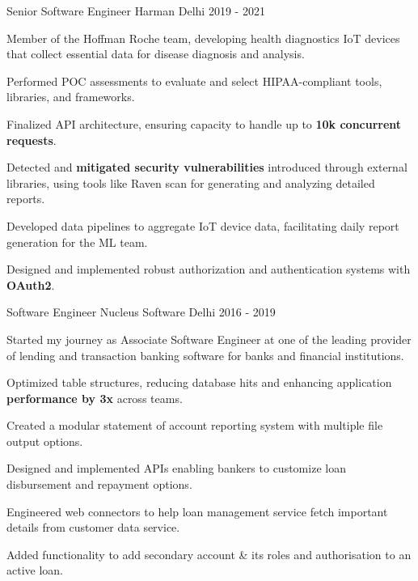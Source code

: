 \begin{cventries}
  \cventry
    {Senior Software Engineer} %
    {Harman} %
    {Delhi} %
    {2019 - 2021} %
    {
      \begin{cvitems} %
        \item {Member of the Hoffman Roche team, developing health diagnostics IoT devices that collect essential data for disease diagnosis and analysis.}
        \item {Performed POC assessments to evaluate and select HIPAA-compliant tools, libraries, and frameworks.}
        \item {Finalized API architecture, ensuring capacity to handle up to \textbf{10k concurrent requests}.}
        \item {Detected and \textbf{mitigated security vulnerabilities} introduced through external libraries, using tools like Raven scan for generating and analyzing detailed reports.}
        \item {Developed data pipelines to aggregate IoT device data, facilitating daily report generation for the ML team.}
        \item {Designed and implemented robust authorization and authentication systems with \textbf{OAuth2}.}
      \end{cvitems}
    }

  \cventry
    {Software Engineer} %
    {Nucleus Software} %
    {Delhi} %
    {2016 - 2019} %
    {
      \begin{cvitems} %
        \item {Started my journey as Associate Software Engineer at one of the leading provider of lending and transaction banking software for banks and financial institutions.}
        \item {Optimized table structures, reducing database hits and enhancing application \textbf{performance by 3x} across teams.}
        \item {Created a modular statement of account reporting system with multiple file output options.}
        \item {Designed and implemented APIs enabling bankers to customize loan disbursement and repayment options.}
        \item {Engineered web connectors to help loan management service fetch important details from customer data service.}
        \item {Added functionality to add secondary account \& its roles and authorisation to an active loan.}
      \end{cvitems}
    }

\end{cventries}